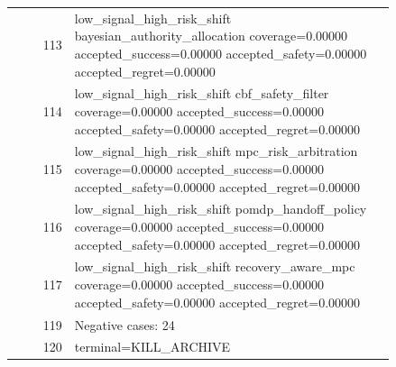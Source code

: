 \documentclass{article}
\begin{document}
\begin{center}
\begin{longtable}{rp{0.84\linewidth}}
113 & low\_signal\_high\_risk\_shift bayesian\_authority\_allocation coverage=0.00000 accepted\_success=0.00000 accepted\_safety=0.00000 accepted\_regret=0.00000\\
114 & low\_signal\_high\_risk\_shift cbf\_safety\_filter coverage=0.00000 accepted\_success=0.00000 accepted\_safety=0.00000 accepted\_regret=0.00000\\
115 & low\_signal\_high\_risk\_shift mpc\_risk\_arbitration coverage=0.00000 accepted\_success=0.00000 accepted\_safety=0.00000 accepted\_regret=0.00000\\
116 & low\_signal\_high\_risk\_shift pomdp\_handoff\_policy coverage=0.00000 accepted\_success=0.00000 accepted\_safety=0.00000 accepted\_regret=0.00000\\
117 & low\_signal\_high\_risk\_shift recovery\_aware\_mpc coverage=0.00000 accepted\_success=0.00000 accepted\_safety=0.00000 accepted\_regret=0.00000\\
119 & Negative cases: 24\\
120 & terminal=KILL\_ARCHIVE\\
\bottomrule
\end{longtable}
\normalsize
\end{center}




\end{document}
